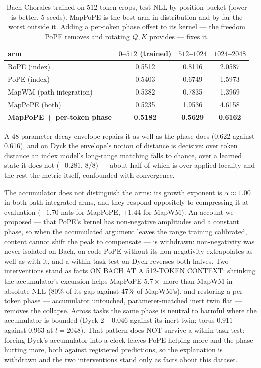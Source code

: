 \documentclass[10pt]{article}
\begin{document}
\begin{table}[h]\centering\footnotesize
\caption{Bach Chorales trained on 512-token crops, test NLL by position bucket (lower is better, 5 seeds).
MapPoPE is the best arm in distribution and by far the worst outside it. Adding a per-token phase offset
to its kernel --- the freedom PoPE removes and rotating $Q,K$ provides --- fixes it.}
\begin{tabular}{lccc}
\toprule
arm & $0$--$512$ (trained) & $512$--$1024$ & $1024$--$2048$ \\
\midrule
RoPE (index) & 0.5512 & 0.8116 & 2.0587 \\
PoPE (index) & 0.5403 & 0.6749 & 1.5973 \\
MapWM (path integration) & 0.5382 & 0.7835 & 1.3969 \\
MapPoPE (both) & 0.5235 & 1.9536 & 4.6158 \\
\textbf{MapPoPE + per-token phase} & \textbf{0.5182} & \textbf{0.5629} & \textbf{0.6162} \\
\bottomrule
\end{tabular}
\end{table}

A 48-parameter decay envelope repairs it as well as the phase does (0.622 against 0.616), and on Dyck the envelope's notion of distance is decisive: over token distance an index model's long-range matching falls to chance, over a learned state it does not ($+0.281$, 8/8) --- about half of which is over-applied locality and the rest the metric itself, confounded with convergence.

The accumulator does not distinguish the arms: its growth exponent is $\alpha\approx1.00$ in both
path-integrated arms, and they respond oppositely to compressing it at evaluation ($-1.70$ nats for MapPoPE,
$+1.44$ for MapWM). An account we proposed --- that PoPE's kernel has non-negative amplitudes and a constant
phase, so when the accumulated argument leaves the range training calibrated, content cannot shift the peak to
compensate --- is withdrawn: non-negativity was never isolated on Bach, on code PoPE without its non-negativity
extrapolates as well as with it, and a within-task test on Dyck reverses both halves. Two interventions stand as facts
ON BACH AT A 512-TOKEN CONTEXT: shrinking the accumulator's excursion helps MapPoPE $5.7\times$ more than
MapWM in absolute NLL (80\% of its gap against 47\% of MapWM's), and restoring a
per-token phase --- accumulator untouched, parameter-matched inert twin flat --- removes the collapse. Across tasks the same phase is neutral to harmful where the accumulator is bounded (Dyck-2 $-0.046$
against its inert twin; torus $0.911$ against $0.963$ at $l=2048$). That pattern does NOT survive a
within-task test: forcing Dyck's accumulator into a clock leaves PoPE helping more and the phase
hurting more, both against registered predictions, so the explanation is withdrawn and the two interventions stand only as facts about this dataset.
\end{document}
